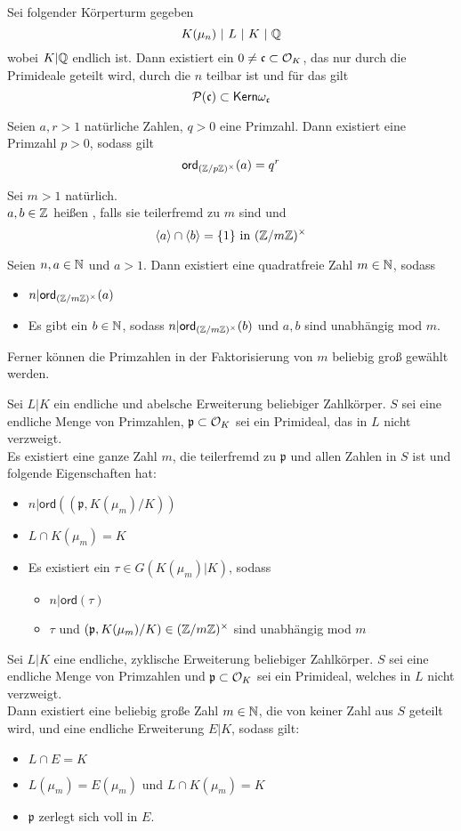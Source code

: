 \documentclass{book}
\newcommand{\cf}{\mathfrak{c}}
\newcommand{\pf}{\mathfrak{p}}
\begin{document}
\Lem{}
Sei folgender Körperturm gegeben
\[ K(\mu_n) ~|~ L ~|~ K ~|~ \mathbb{Q} \]
wobei $K|\mathbb{Q}$ endlich ist. Dann existiert ein $0\neq \cf \subset \O_K$, das nur durch die Primideale geteilt wird, durch die $n$ teilbar ist und für das gilt
\[ \P(\cf) \subset \Ker \omega_\cf \]

\Lem{}
Seien $a,r > 1$ natürliche Zahlen, $q > 0$ eine Primzahl. Dann existiert eine Primzahl $p > 0$, sodass gilt
\[ \textsf{ord}_{(\mathbb{Z}/p\mathbb{Z})^\times}(a) = q^r \]

Sei $m > 1$ natürlich.\\
$a,b \in \mathbb{Z}$ heißen , falls sie teilerfremd zu $m$ sind und
\[ \left<a\right> \cap \left<b\right> = \{1\}  \text{ in }(\mathbb{Z} /m\mathbb{Z})^\times \]

\Lem{}
Seien $n,a\in \mathbb{N}$ und $a > 1$. Dann existiert eine quadratfreie Zahl $m \in \mathbb{N}$, sodass
\begin{itemize}
\item $n | \textsf{ord}_{(\mathbb{Z}/m\mathbb{Z})^\times}(a)$
\item Es gibt ein $b \in \mathbb{N}$, sodass $n|\textsf{ord}_{(\mathbb{Z}/m\mathbb{Z})^\times}(b)$ und $a,b$ sind unabhängig mod $m$.
\end{itemize} 
Ferner können die Primzahlen in der Faktorisierung von $m$ beliebig groß gewählt werden.

\Lem{}
Sei $L|K$ ein endliche und abelsche Erweiterung beliebiger Zahlkörper. $S$ sei eine endliche Menge von Primzahlen, $\pf \subset \O_K$ sei ein Primideal, das in $L$ nicht verzweigt.\\
Es existiert eine ganze Zahl $m$, die teilerfremd zu $\pf$ und allen Zahlen in $S$ ist und folgende Eigenschaften hat:
\begin{itemize}
\item $n | \textsf{ord}((\pf, K(\mu_m) / K))$
\item $L\cap K(\mu_m) = K$
\item Es existiert ein $\tau \in G(K(\mu_m) | K)$, sodass
\begin{itemize}
\item $n|\textsf{ord}(\tau)$
\item $\tau$ und $(\pf, K(\mu_m)/K) \in (\Z/m\Z)^\times$ sind unabhängig mod $m$
\end{itemize}
\end{itemize} 

Sei $L|K$ eine endliche, zyklische Erweiterung beliebiger Zahlkörper. $S$ sei eine endliche Menge von Primzahlen und $\pf \subset \O_K$ sei ein Primideal, welches in $L$ nicht verzweigt.\\
Dann existiert eine beliebig große Zahl $m \in \mathbb{N}$, die von keiner Zahl aus $S$ geteilt wird, und eine endliche Erweiterung $E|K$, sodass gilt:
\begin{itemize}
\item $L\cap E = K$
\item $L(\mu_m) = E(\mu_m)$ und $L\cap K(\mu_m) = K$
\item $\pf$ zerlegt sich voll in $E$.
\end{itemize} 


\printindex
\end{document}
